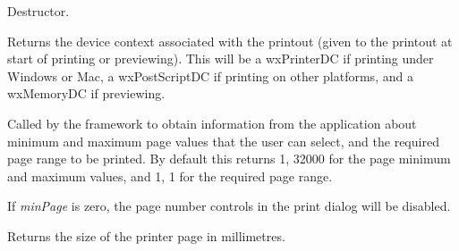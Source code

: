 \label{wxprintoutdtor}


Destructor.


\label{wxprintoutgetdc}


Returns the device context associated with the printout (given to the printout at start of
printing or previewing). This will be a wxPrinterDC if printing under Windows or Mac,
a wxPostScriptDC if printing on other platforms, and a wxMemoryDC if previewing.


\label{wxprintoutgetpageinfo}


Called by the framework to obtain information from the application about minimum
and maximum page values that the user can select, and the required page range to
be printed. By default this returns 1, 32000 for the page minimum and maximum
values, and 1, 1 for the required page range.

If {\it minPage} is zero, the page number controls in the print dialog will be disabled.




\label{wxprintoutgetpagesizemm}


Returns the size of the printer page in millimetres.




\label{wxprintoutgetpagesizepixels}


